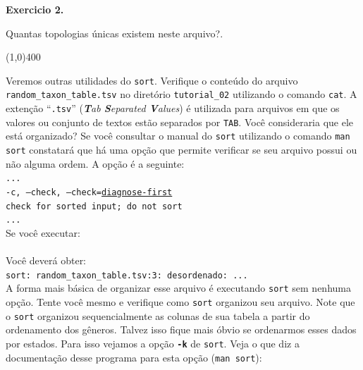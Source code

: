 \begin{refsection}
\begin{blackBlock}{\textbf{Exercicio 2.}}\label{tut2:ex:2.3}

Quantas topologias únicas existem neste arquivo?.

\end{blackBlock}

\begin{center}
\line(1,0){400}\\
\end{center}

\vspace{30pt}


Veremos outras utilidades do \texttt{sort}. Verifique o conteúdo do arquivo \texttt{random\_taxon\_table.tsv} no diretório \texttt{tutorial\_02} utilizando o comando \texttt{cat}. A extenção ``\texttt{.tsv}'' (\textit{\textbf{T}ab \textbf{S}eparated \textbf{V}alues}) é utilizada para arquivos em que os valores ou conjunto de textos estão separados por \texttt{TAB}. Você consideraria que ele está organizado? Se você consultar o manual do \texttt{sort} utilizando o comando \texttt{man sort} constatará que há uma opção que permite verificar se seu arquivo possui ou não alguma ordem. A opção é a seguinte:\\

\noindent\texttt{...}\\
\texttt{-c, --check, --check=\underline{diagnose-first}}\\
\indent\indent\texttt{check for sorted input; do not sort}\\
\texttt{...}\\

Se você executar:\\
\\

Você deverá obter:\\
\texttt{sort: random\_taxon\_table.tsv:3: desordenado: ...}\\

A forma mais básica de organizar esse arquivo é executando \texttt{sort} sem nenhuma opção. Tente você mesmo e verifique como \texttt{sort} organizou seu arquivo. Note que o \texttt{sort} organizou sequencialmente as colunas de sua tabela a partir do ordenamento dos gêneros. Talvez isso fique mais óbvio se ordenarmos esses dados por estados. Para isso vejamos a opção \texttt{\textbf{-k}} de \texttt{sort}. Veja o que diz a documentação desse programa para esta opção (\texttt{man sort}):\\


\end{refsection}
